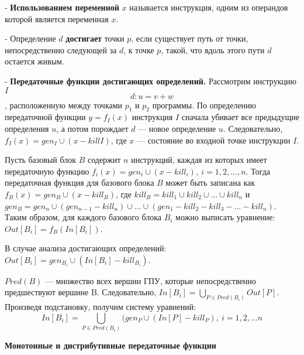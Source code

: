 - \textbf{Использованием переменной} $x$ называется инструкция, одним из операндов которой является переменная $x$.

- Определение $d$ \textbf{достигает} точки $p$, если существует путь от точки, непосредственно следующей за $d$, к точке $p$, такой, что вдоль этого пути $d$ остается живым.

- \textbf{Передаточные функции достигающих определений.}
Рассмотрим инструкцию $I$
$$d: u = v + w$$,
расположенную между точками $p_1$ и $p_2$ программы.
По определению передаточной функции $y = f_I(x)$ инструкция $I$ сначала убивает все предыдущие определения $u$, а потом порождает $d$ --- новое определение $u$.
Следовательно, $f_I(x) = gen_I \cup (x - kill I)$, где $x$ --- состояние во входной точке инструкции $I$.

Пусть базовый блок $B$ содержит $n$ инструкций, каждая из которых имеет передаточную функцию $f_i(x) = gen_i \cup (x - kill_i),~i = 1, 2, \dots, n$.
Тогда передаточная функция для базового блока $B$ может быть записана как $f_B(x) = gen_B \cup (x - kill_B)$, где $kill_B = kill_1 \cup kill_2 \cup \dots \cup kill_n$ и $gen_B = gen_n \cup (gen_{n-1} - kill_n) \cup \dots \cup (gen_1 - kill_2 - kill_3 - \dots - kill_n)$.
Таким образом, для каждого базового блока $B_i$ можно выписать уравнение: $Out[B_i] = f_B(In[B_i])$.

В случае анализа достигающих определений: $Out[B_i] = gen_{B_i} \cup (In[B_i] - kill_{B_i})$.

$Pred(B)$ --- множество всех вершин ГПУ, которые непосредственно предшествуют вершине B.
Следовательно, $In[B_i] = \bigcup_{P \in Pred(B_i)} Out[P]$.
Произведя подстановку, получим систему уравнений:
$$In[B_i] = \displaystyle\bigcup_{P \in Pred(B_i)} (gen_P \cup (In[P] - kill_P),~i = 1, 2, \dots n$$


\textbf{Монотонные и дистрибутивные передаточные функции}

